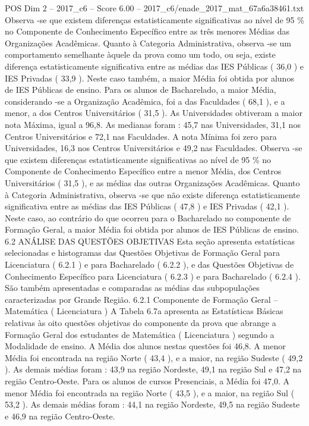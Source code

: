 \begin{textsample}{POS Dim 2 – 2017\_c6 – Score 6.00 – 2017\_c6/enade\_2017\_mat\_67a6a38461.txt}
Observa -se que existem diferenças estatisticamente significativas ao nível de 95 \% no Componente de Conhecimento Específico entre as três menores Médias das Organizações Acadêmicas.
Quanto à Categoria Administrativa, observa -se um comportamento semelhante àquele da prova como um todo, ou seja, existe diferença estatisticamente significativa entre as médias das IES Públicas ( 36,0 ) e IES Privadas ( 33,9 ).
Neste caso também, a maior Média foi obtida por alunos de IES Públicas de ensino.
Para os alunos de Bacharelado, a maior Média, considerando -se a Organização Acadêmica, foi a das Faculdades ( 68,1 ), e a menor, a dos Centros Universitários ( 31,5 ).
As Universidades obtiveram a maior nota Máxima, igual a 96,8.
As medianas foram : 45,7 nas Universidades, 31,1 nos Centros Universitários e 72,1 nas Faculdades.
A nota Mínima foi zero para Universidades, 16,3 nos Centros Universitários e 49,2 nas Faculdades.
Observa -se que existem diferenças estatisticamente significativas ao nível de 95 \% no Componente de Conhecimento Específico entre a menor Média, dos Centros Universitários ( 31,5 ), e as médias das outras Organizações Acadêmicas.
Quanto à Categoria Administrativa, observa -se que não existe diferença estatisticamente significativa entre as médias das IES Públicas ( 47,8 ) e IES Privadas ( 42,1 ).
Neste caso, ao contrário do que ocorreu para o Bacharelado no componente de Formação Geral, a maior Média foi obtida por alunos de IES Públicas de ensino. 6.2 ANÁLISE DAS QUESTÕES OBJETIVAS Esta seção apresenta estatísticas selecionadas e histogramas das Questões Objetivas de Formação Geral para Licenciatura ( 6.2.1 ) e para Bacharelado ( 6.2.2 ), e das Questões Objetivas de Conhecimento Específico para Licenciatura ( 6.2.3 ) e para Bacharelado ( 6.2.4 ).
São também apresentadas e comparadas as médias das subpopulações caracterizadas por Grande Região. 6.2.1 Componente de Formação Geral – Matemática ( Licenciatura ) A Tabela 6.7a apresenta as Estatísticas Básicas relativas às oito questões objetivas do componente da prova que abrange a Formação Geral dos estudantes de Matemática ( Licenciatura ) segundo a Modalidade de ensino.
A Média dos alunos nestas questões foi 46,8.
A menor Média foi encontrada na região Norte ( 43,4 ), e a maior, na região Sudeste ( 49,2 ).
As demais médias foram : 43,9 na região Nordeste, 49,1 na região Sul e 47,2 na região Centro-Oeste.
Para os alunos de cursos Presenciais, a Média foi 47,0.
A menor Média foi encontrada na região Norte ( 43,5 ), e a maior, na região Sul ( 53,2 ).
As demais médias foram : 44,1 na região Nordeste, 49,5 na região Sudeste e 46,9 na região Centro-Oeste.

\end{textsample}
